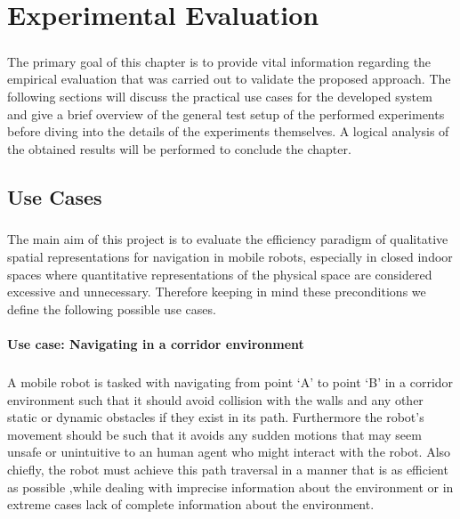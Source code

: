 
\chapter{Experimental Evaluation}

\paragraph{} The primary goal of this chapter is to provide vital information regarding the empirical evaluation that was carried out to validate the proposed approach. The following sections will discuss the practical use cases for the developed system and give a brief overview of the general test setup of the performed experiments before diving into the details of the experiments themselves. A logical analysis of the obtained results will be performed to conclude the chapter.

\section{Use Cases}
\paragraph{} The main aim of this project is to evaluate the efficiency paradigm of qualitative spatial representations for navigation in mobile robots, especially in closed indoor spaces where quantitative representations of the physical space are considered excessive and unnecessary. Therefore keeping in mind these preconditions we define the following possible use cases.

\subsubsection*{Use case: Navigating in a corridor environment} 
\paragraph{} A mobile robot is tasked with navigating from point `A' to point `B' in a corridor environment such that it should avoid collision with the walls and any other static or dynamic obstacles if they exist in its path. Furthermore the robot's movement should be such that it avoids any sudden motions that may seem unsafe or unintuitive to an human agent who might interact with the robot. Also chiefly, the robot must achieve this path traversal in a manner that is as efficient as possible ,while dealing with imprecise information about the environment or in extreme cases lack of complete information about the environment. 

